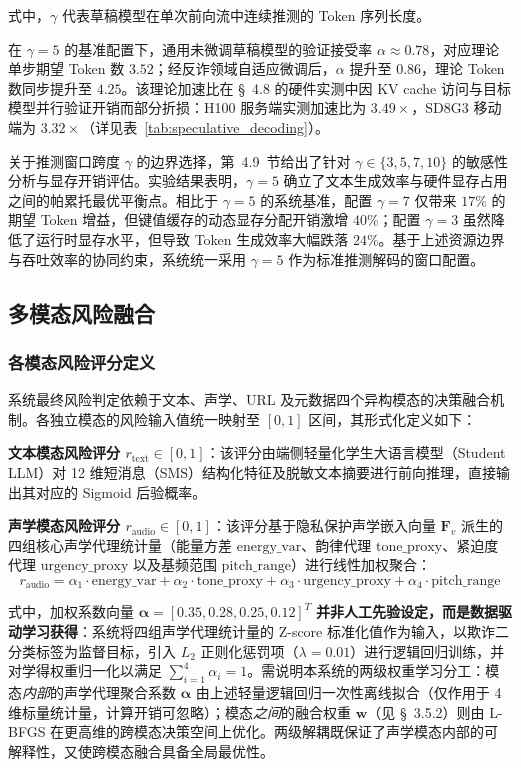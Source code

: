 \documentclass[11pt, a4paper]{article}
\begin{document}
式中，$\gamma$ 代表草稿模型在单次前向流中连续推测的 Token 序列长度。

在 $\gamma = 5$ 的基准配置下，通用未微调草稿模型的验证接受率 $\alpha \approx 0.78$，对应理论单步期望 Token 数 $3.52$；经反诈领域自适应微调后，$\alpha$ 提升至 $0.86$，理论 Token 数同步提升至 $4.25$。该理论加速比在 \S~4.8 的硬件实测中因 KV cache 访问与目标模型并行验证开销而部分折损：H100 服务端实测加速比为 $3.49\times$，SD8G3 移动端为 $3.32\times$（详见表~\ref{tab:speculative_decoding}）。

关于推测窗口跨度 $\gamma$ 的边界选择，第~4.9~节给出了针对 $\gamma \in \{3,5,7,10\}$ 的敏感性分析与显存开销评估。实验结果表明，$\gamma=5$ 确立了文本生成效率与硬件显存占用之间的帕累托最优平衡点。相比于 $\gamma=5$ 的系统基准，配置 $\gamma=7$ 仅带来 $17\%$ 的期望 Token 增益，但键值缓存的动态显存分配开销激增 $40\%$；配置 $\gamma=3$ 虽然降低了运行时显存水平，但导致 Token 生成效率大幅跌落 $24\%$。基于上述资源边界与吞吐效率的协同约束，系统统一采用 $\gamma=5$ 作为标准推测解码的窗口配置。

\subsection{多模态风险融合}
\subsubsection{各模态风险评分定义}

系统最终风险判定依赖于文本、声学、URL 及元数据四个异构模态的决策融合机制。各独立模态的风险输入值统一映射至 $[0,1]$ 区间，其形式化定义如下：

\textbf{文本模态风险评分 $r_{\mathrm{text}} \in [0,1]$}：该评分由端侧轻量化学生大语言模型（Student LLM）对 12 维短消息（SMS）结构化特征及脱敏文本摘要进行前向推理，直接输出其对应的 Sigmoid 后验概率。

\textbf{声学模态风险评分 $r_{\mathrm{audio}} \in [0,1]$}：该评分基于隐私保护声学嵌入向量 $\bm{F}_v$ 派生的四组核心声学代理统计量（能量方差 $\text{energy\_var}$、韵律代理 $\text{tone\_proxy}$、紧迫度代理 $\text{urgency\_proxy}$ 以及基频范围 $\text{pitch\_range}$）进行线性加权聚合：
    \begin{equation}
    \label{eq:voice_risk}
        r_{\mathrm{audio}} = \alpha_1 \cdot \text{energy\_var} + \alpha_2 \cdot \text{tone\_proxy} + \alpha_3 \cdot \text{urgency\_proxy} + \alpha_4 \cdot \text{pitch\_range}
    \end{equation}
    
式中，加权系数向量 $\bm{\alpha} = [0.35, 0.28, 0.25, 0.12]^T$ \textbf{并非人工先验设定，而是数据驱动学习获得}：系统将四组声学代理统计量的 Z-score 标准化值作为输入，以欺诈二分类标签为监督目标，引入 $L_2$ 正则化惩罚项（$\lambda = 0.01$）进行逻辑回归训练，并对学得权重归一化以满足 $\sum_{i=1}^4 \alpha_i = 1$。需说明本系统的两级权重学习分工：模态\emph{内部}的声学代理聚合系数 $\bm{\alpha}$ 由上述轻量逻辑回归一次性离线拟合（仅作用于 4 维标量统计量，计算开销可忽略）；模态\emph{之间}的融合权重 $\mathbf{w}$（见 \S~3.5.2）则由 L-BFGS 在更高维的跨模态决策空间上优化。两级解耦既保证了声学模态内部的可解释性，又使跨模态融合具备全局最优性。
\end{document}
